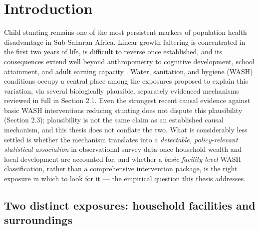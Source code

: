 
\section{Introduction}\label{sec:1}

Child stunting remains one of the most persistent markers of population health disadvantage in Sub-Saharan Africa. Linear growth faltering is concentrated in the first two years of life, is difficult to reverse once established, and its consequences extend well beyond anthropometry to cognitive development, school attainment, and adult earning capacity \autocite{Victora2008,Victora2010,Black2013}. Water, sanitation, and hygiene (WASH) conditions occupy a central place among the exposures proposed to explain this variation, via several biologically plausible, separately evidenced mechanisms reviewed in full in Section 2.1. Even the strongest recent causal evidence against basic WASH interventions reducing stunting does not dispute this plausibility (Section 2.3); plausibility is not the same claim as an established causal mechanism, and this thesis does not conflate the two. What is considerably less settled is whether the mechanism translates into a \emph{detectable, policy-relevant statistical association} in observational survey data once household wealth and local development are accounted for, and whether a \emph{basic facility-level} WASH classification, rather than a comprehensive intervention package, is the right exposure in which to look for it --- the empirical question this thesis addresses.

\subsection{Two distinct exposures: household facilities and surroundings}\label{sec:1.1}

